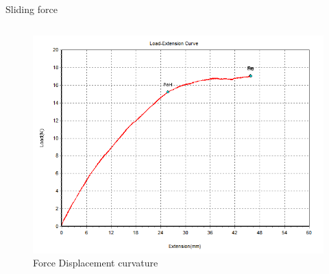 \documentclass[10pt]{beamer}
\begin{document}
\begin{frame}[fragile]{Sliding force}
\begin{columns}[T,onlytextwidth]
\begin{figure}
	\includegraphics[scale=0.5]{Test1ChestHold}
	\caption{Force Displacement curvature}
	\end{figure}
\end{columns}
\end{frame}
\end{document}
